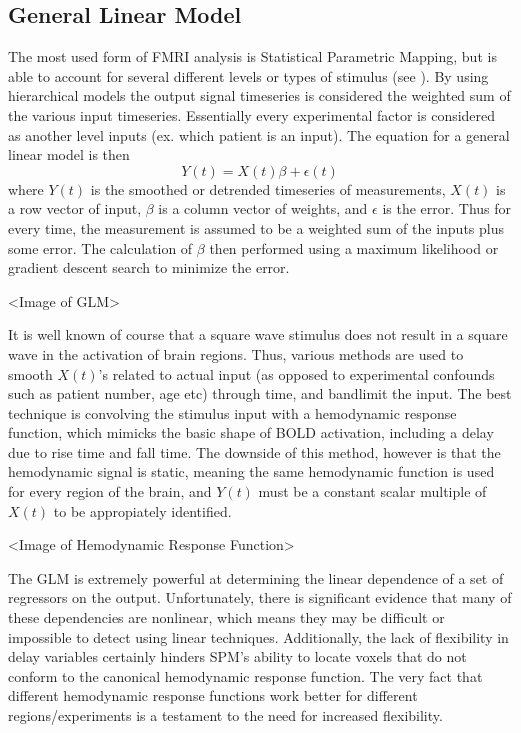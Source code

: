 \documentclass{article}
\begin{document}
\subsection{General Linear Model}
The most used form of FMRI analysis is Statistical Parametric
Mapping, but is able to account for several different levels or types
of stimulus (see \cite{Hofmann1997}). By using hierarchical models
the output signal timeseries is considered the weighted
sum of the various input timeseries. Essentially every experimental factor
is considered as another level inputs (ex. which patient is an input). 
The equation for a general linear model is then
\begin{equation}
Y(t) = X(t)\beta + \epsilon(t)
\end{equation}
where $Y(t)$ is the smoothed or detrended timeseries of measurements,
$X(t)$ is a row vector of input, $\beta$ is a column vector of weights,
and $\epsilon$ is the error. Thus for every time, the measurement is
assumed to be a weighted sum of the inputs plus some error. The calculation
of $\beta$ then performed using a maximum likelihood or gradient descent search 
to minimize the error.

<Image of GLM>

It is well known of course that a square wave stimulus does not result in a square wave
in the activation of brain regions. Thus, various methods are used to 
smooth $X(t)$'s related to actual input (as opposed to experimental confounds
such as patient number, age etc) through time, and bandlimit the input. 
The best technique is convolving the stimulus input with a hemodynamic 
response function, which mimicks the basic shape of BOLD activation, including a delay
due to rise time and fall time. The downside of this method, however is that 
the hemodynamic signal is static, meaning the same hemodynamic function is
used for every region of the brain, and $Y(t)$ must be a constant
scalar multiple of $X(t)$ to be appropiately identified. 

<Image of Hemodynamic Response Function>

The GLM is extremely powerful at determining the linear dependence of
a set of regressors on the output. Unfortunately, there is significant evidence
that many of these dependencies are nonlinear, which means they may be
difficult or impossible to detect using linear techniques. Additionally, 
the lack of flexibility in delay variables certainly hinders SPM's
ability to locate voxels that do not conform to the canonical hemodynamic 
response function. The very fact that different hemodynamic response functions
work better for different regions/experiments is a testament to the need
for increased flexibility. 
\end{document}
